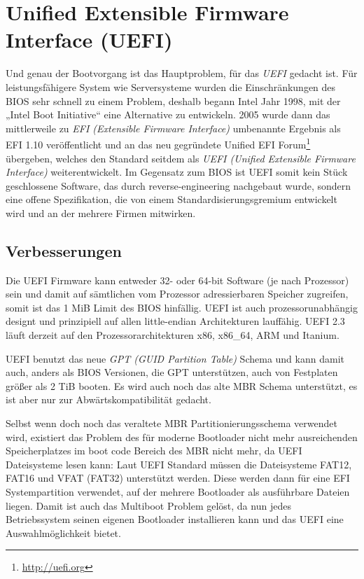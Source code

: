 \documentclass[12pt,ngerman,twopage]{scrartcl}
\begin{document}
\section{Unified Extensible Firmware Interface (UEFI)}
Und genau der Bootvorgang ist das Hauptproblem, für das \textit{UEFI} gedacht ist. Für leistungsfähigere System wie Serversysteme wurden die Einschränkungen des BIOS sehr schnell zu einem Problem, deshalb begann Intel Jahr 1998, mit der „Intel Boot Initiative“ eine Alternative zu entwickeln. 2005 wurde dann das mittlerweile zu \textit{EFI (Extensible Firmware Interface)} umbenannte Ergebnis als EFI 1.10 veröffentlicht und an das neu gegründete Unified EFI Forum\footnote{\url{http://uefi.org}} übergeben, welches den Standard seitdem als \textit{UEFI (Unified Extensible Firmware Interface)} weiterentwickelt. Im Gegensatz zum BIOS ist UEFI somit kein Stück geschlossene Software, das durch reverse-engineering nachgebaut wurde, sondern eine offene Spezifikation, die von einem Standardisierungsgremium entwickelt wird und an der mehrere Firmen mitwirken.
\subsection{Verbesserungen}
Die UEFI Firmware kann entweder 32- oder 64-bit Software (je nach Prozessor) sein und damit auf sämtlichen vom Prozessor adressierbaren Speicher zugreifen, somit ist das 1 MiB Limit des BIOS hinfällig.
UEFI ist auch prozessorunabhängig designt und prinzipiell auf allen little-endian Architekturen lauffähig.  UEFI 2.3 läuft derzeit auf den Prozessorarchitekturen x86, x86\_64, ARM und Itanium.

UEFI benutzt das neue \textit{GPT (GUID Partition Table)} Schema und kann damit auch, anders als BIOS Versionen, die GPT unterstützen, auch von Festplaten größer als 2 TiB booten. Es wird auch noch das alte MBR Schema unterstützt, es ist aber nur zur Abwärtskompatibilität gedacht.

Selbst wenn doch noch das veraltete MBR Partitionierungsschema verwendet wird, existiert das Problem des für moderne Bootloader nicht mehr ausreichenden Speicherplatzes im boot code Bereich des MBR nicht mehr, da UEFI Dateisysteme lesen kann: Laut UEFI Standard müssen die Dateisysteme FAT12, FAT16 und VFAT (FAT32) unterstützt werden. Diese werden dann für eine EFI Systempartition verwendet, auf der mehrere Bootloader als ausführbare Dateien liegen. Damit ist auch das Multiboot Problem gelöst, da nun jedes Betriebssystem seinen eigenen Bootloader installieren kann und das UEFI eine Auswahlmöglichkeit bietet.
\end{document}
